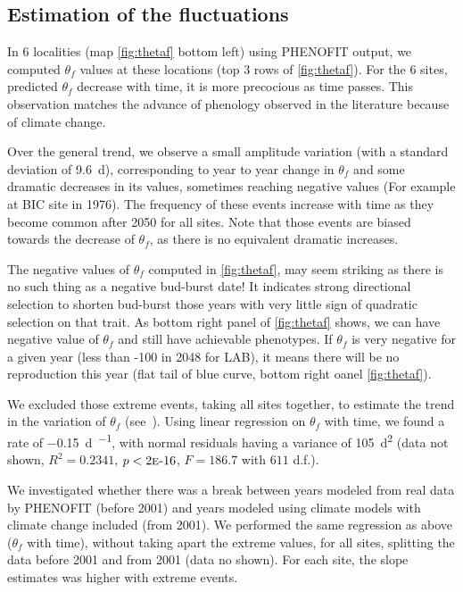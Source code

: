 \subsection*{Estimation of the fluctuations}

In 6 localities (map \autoref{fig:thetaf} bottom left) using \textsc{PHENOFIT} output, we computed $\theta_f$ values at these locations (top 3 rows of \autoref{fig:thetaf}). For the 6 sites, predicted $\theta_f$ decrease with time, it is more precocious as time passes. This observation matches the advance of phenology observed in the literature because of climate change.

Over the general trend, we observe a small amplitude variation (with a standard deviation of \SI{9.6}{\day}), corresponding to year to year change in $\theta_f$ and some dramatic decreases in its values, sometimes reaching negative values (For example at BIC site in 1976). The frequency of these events increase with time as they become common after 2050 for all sites. Note that those events are biased towards the decrease of $\theta_f$, as there is no equivalent dramatic increases.

The negative values of $\theta_f$ computed in \autoref{fig:thetaf}, may seem striking as there is no such thing as a negative bud-burst date! It indicates strong directional selection to shorten bud-burst those years with very little sign of quadratic selection on that trait. As bottom right panel of \autoref{fig:thetaf} shows, we can have negative value of $\theta_f$ and still have achievable phenotypes. If $\theta_f$ is very negative for a given year (less than -100 in 2048 for LAB), it means there will be no reproduction this year (flat tail of blue curve, bottom right oanel \autoref{fig:thetaf}).

We excluded those extreme events, taking all sites together, to estimate the trend in the variation of $\theta_f$ (see~). Using linear regression on $\theta_f$ with time, we found a rate of \SI{-0.15}{\day\per\year}, with normal residuals having a variance of \SI{105}{\day\squared} (data not shown, $R^2=0.2341$, $p<2\text{\sc{e}-}16$, $F=186.7$ with $611$ d.f.).

We investigated whether there was a break between years modeled from real data by \textsc{PHENOFIT} (before 2001) and years modeled using climate models with climate change included (from 2001). We performed the same regression as above ($\theta_f$ with time), without taking apart the extreme values, for all sites, splitting the data before 2001 and from 2001 (data no shown). For each site, the slope estimates was higher with extreme events.


